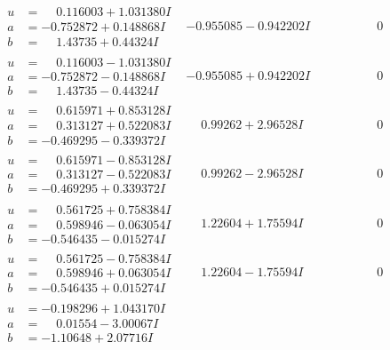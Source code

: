 \documentclass[1p]{elsarticle_modified}
\theoremstyle{definition}
\begin{document}
$$\begin{array}{c|c|c}
\begin{aligned}
u &= \phantom{-}0.116003 + 1.031380 I \\
a &= -0.752872 + 0.148868 I \\
b &= \phantom{-}1.43735 + 0.44324 I\end{aligned}
 & -0.955085 - 0.942202 I & \phantom{-0.000000 } 0 \\ \hline\begin{aligned}
u &= \phantom{-}0.116003 - 1.031380 I \\
a &= -0.752872 - 0.148868 I \\
b &= \phantom{-}1.43735 - 0.44324 I\end{aligned}
 & -0.955085 + 0.942202 I & \phantom{-0.000000 } 0 \\ \hline\begin{aligned}
u &= \phantom{-}0.615971 + 0.853128 I \\
a &= \phantom{-}0.313127 + 0.522083 I \\
b &= -0.469295 - 0.339372 I\end{aligned}
 & \phantom{-}0.99262 + 2.96528 I & \phantom{-0.000000 } 0 \\ \hline\begin{aligned}
u &= \phantom{-}0.615971 - 0.853128 I \\
a &= \phantom{-}0.313127 - 0.522083 I \\
b &= -0.469295 + 0.339372 I\end{aligned}
 & \phantom{-}0.99262 - 2.96528 I & \phantom{-0.000000 } 0 \\ \hline\begin{aligned}
u &= \phantom{-}0.561725 + 0.758384 I \\
a &= \phantom{-}0.598946 - 0.063054 I \\
b &= -0.546435 - 0.015274 I\end{aligned}
 & \phantom{-}1.22604 + 1.75594 I & \phantom{-0.000000 } 0 \\ \hline\begin{aligned}
u &= \phantom{-}0.561725 - 0.758384 I \\
a &= \phantom{-}0.598946 + 0.063054 I \\
b &= -0.546435 + 0.015274 I\end{aligned}
 & \phantom{-}1.22604 - 1.75594 I & \phantom{-0.000000 } 0 \\ \hline\begin{aligned}
u &= -0.198296 + 1.043170 I \\
a &= \phantom{-}0.01554 - 3.00067 I \\
b &= -1.10648 + 2.07716 I\end{aligned}

\end{array}$$
\end{document}
